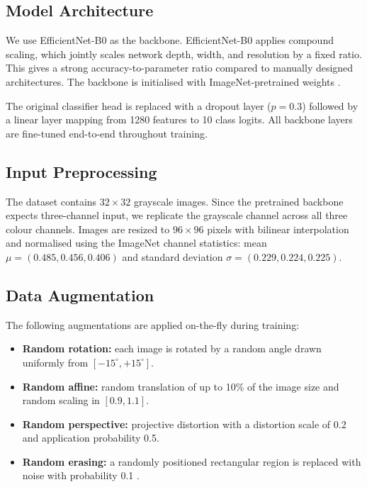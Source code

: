 \documentclass[a4paper,fleqn]{cas-sc}
\begin{document}
\subsection{Model Architecture}

We use EfficientNet-B0 \citep{tan2019efficientnet} as the backbone. EfficientNet-B0 applies compound scaling, which jointly scales network depth, width, and resolution by a fixed ratio. This gives a strong accuracy-to-parameter ratio compared to manually designed architectures. The backbone is initialised with ImageNet-pretrained weights \citep{deng2009imagenet}.

The original classifier head is replaced with a dropout layer ($p = 0.3$) \citep{srivastava2014dropout} followed by a linear layer mapping from 1280 features to 10 class logits. All backbone layers are fine-tuned end-to-end throughout training.

\subsection{Input Preprocessing}

The dataset contains $32 \times 32$ grayscale images. Since the pretrained backbone expects three-channel input, we replicate the grayscale channel across all three colour channels. Images are resized to $96 \times 96$ pixels with bilinear interpolation and normalised using the ImageNet channel statistics: mean $\mu = (0.485, 0.456, 0.406)$ and standard deviation $\sigma = (0.229, 0.224, 0.225)$.

\subsection{Data Augmentation}

The following augmentations are applied on-the-fly during training:

\begin{itemize}
    \item \textbf{Random rotation:} each image is rotated by a random angle drawn uniformly from $[-15^\circ, +15^\circ]$.
    \item \textbf{Random affine:} random translation of up to 10\% of the image size and random scaling in $[0.9, 1.1]$.
    \item \textbf{Random perspective:} projective distortion with a distortion scale of 0.2 and application probability 0.5.
    \item \textbf{Random erasing:} a randomly positioned rectangular region is replaced with noise with probability 0.1 \citep{zhong2020random}.
\end{itemize}
\end{document}

